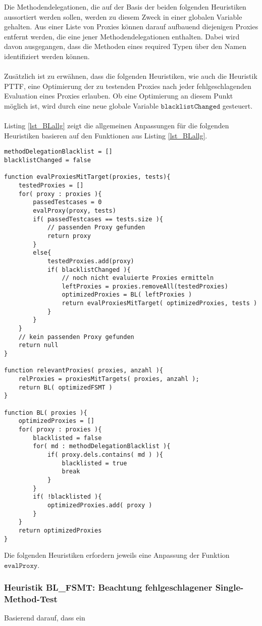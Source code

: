 \noindent
Die Methodendelegationen, die auf der Basis der beiden folgenden Heuristiken aussortiert werden sollen, werden zu diesem Zweck in einer globalen Variable gehalten. Aus einer Liste von Proxies können darauf aufbauend diejenigen Proxies entfernt werden, die eine jener Methodendelegationen enthalten. Dabei wird davon ausgegangen, dass die Methoden eines required Typen über den Namen identifiziert werden können.
\\\\
Zusätzlich ist zu erwähnen, dass die folgenden Heuristiken, wie auch die Heuristik PTTF, eine Optimierung der zu testenden Proxies nach jeder fehlgeschlagenden Evaluation eines Proxies erlauben. Ob eine Optimierung an diesem Punkt möglich ist, wird durch eine neue globale Variable $\texttt{blacklistChanged}$ gesteuert.
\\\\
Listing \ref{lst_BLallg} zeigt die allgemeinen Anpassungen für die folgenden Heuristiken basieren auf den Funktionen aus Listing \ref{lst_BLallg}.
\begin{lstlisting}[style = pseudo, label = lst_BLallg]
methodDelegationBlacklist = []
blacklistChanged = false

function evalProxiesMitTarget(proxies, tests){
	testedProxies = []
	for( proxy : proxies ){
		passedTestcases = 0
		evalProxy(proxy, tests)
		if( passedTestcases == tests.size ){
			// passenden Proxy gefunden
			return proxy
		}
		else{
			testedProxies.add(proxy)
			if( blacklistChanged ){
				// noch nicht evaluierte Proxies ermitteln
				leftProxies = proxies.removeAll(testedProxies)
				optimizedProxies = BL( leftProxies )	
				return evalProxiesMitTarget( optimizedProxies, tests )
			}
		}
	}
	// kein passenden Proxy gefunden
	return null
}

function relevantProxies( proxies, anzahl ){
	relProxies = proxiesMitTargets( proxies, anzahl );
	return BL( optimizedFSMT )
}  

function BL( proxies ){
	optimizedProxies = []	
	for( proxy : proxies ){
		blacklisted = false
		for( md : methodDelegationBlacklist ){
			if( proxy.dels.contains( md ) ){
				blacklisted = true
				break
			}	
		}
		if( !blacklisted ){
			optimizedProxies.add( proxy )
		}
	}
	return optimizedProxies
}

\end{lstlisting}
\noindent
Die folgenden Heuristiken erfordern jeweils eine Anpassung der Funktion $\texttt{evalProxy}$.


\subsubsection{Heuristik BL\_FSMT: Beachtung fehlgeschlagener Single-Method-Test}
Basierend darauf, dass ein 


